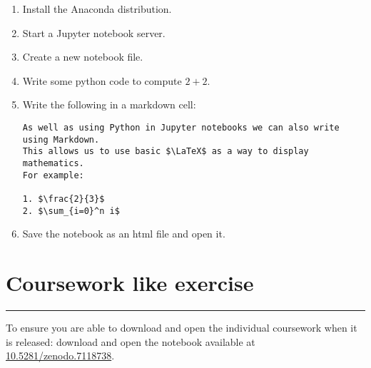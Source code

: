 \documentclass{article}
\begin{document}
\begin{enumerate}
\item
  Install the Anaconda distribution.
\item
  Start a Jupyter notebook server.
\item
  Create a new notebook file.
\item
  Write some python code to compute \(2 + 2\).
\item
  Write the following in a markdown cell:


\begin{verbatim}
As well as using Python in Jupyter notebooks we can also write using Markdown.
This allows us to use basic $\LaTeX$ as a way to display mathematics.
For example:

1. $\frac{2}{3}$
2. $\sum_{i=0}^n i$
\end{verbatim}

\item Save the notebook as an html file and open it.
\end{enumerate}


\section{Coursework like exercise}
\hrule

To ensure you are able to download and open the individual coursework when it
is released: download and open the notebook available at
\href{https://zenodo.org/record/7118738/files/demo.ipynb?download=1}{10.5281/zenodo.7118738}.
\end{document}
